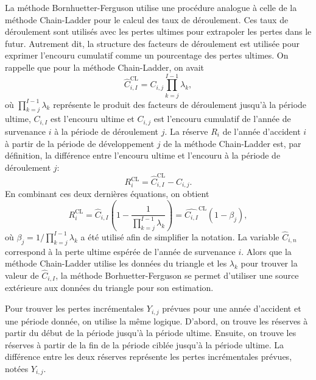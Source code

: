 La méthode Bornhuetter-Ferguson utilise une procédure analogue à celle
de la méthode Chain-Ladder pour le calcul des taux de déroulement. Ces
taux de déroulement sont utilisés avec les pertes ultimes pour
extrapoler les pertes dans le futur. Autrement dit, la structure des
facteurs de déroulement est utilisée pour exprimer l'encouru cumulatif
comme un pourcentage des pertes ultimes. On rappelle que pour la
méthode Chain-Ladder, on avait
\begin{equation*}
  \hat{C}_{i, I}^{\text{CL}} = C_{i, j} \prod_{k = j}^{I-1} \lambda_k,
\end{equation*}
où $\prod_{k=j}^{I-1} \lambda_k $ représente le produit des facteurs
de déroulement jusqu'à la période ultime, $C_{i, I}$ est l'encouru
ultime et $C_{i, j}$ est l'encouru cumulatif de l'année de survenance
$i$ à la période de déroulement $j$. La réserve $R_i$ de l'année
d'accident $i$ à partir de la période de développement $j$ de la
méthode Chain-Ladder est, par définition, la différence entre
l'encouru ultime et l'encouru à la période de déroulement $j$:
\begin{equation*}
  R_i^{\text{CL}} = \hat{C}_{i, I}^{\text{CL}} - C_{i, j}.
\end{equation*}
En combinant ces deux dernières équations, on obtient
\begin{equation*}
  R_i^{\text{CL}} = \hat{C}_{i, I}
  \left(
    1 - \frac{1}{\prod_{k=j}^{I-1} \lambda_k}
  \right) =  \hat{C_{i, I}}^{\text{CL}} (1 - \beta_j),
\end{equation*}
où $\beta_j = 1/\prod_{k=j}^{I-1} \lambda_k$ a été utilisé afin
de simplifier la notation. La variable $\hat{C}_{i,n}$ correspond à la
perte ultime espérée de l'année de survenance $i$. Alors que la
méthode Chain-Ladder utilise les données du triangle et les
$\lambda_k$ pour trouver la valeur de $\hat{C}_{i,I}$, la méthode
Borhuetter-Ferguson se permet d'utiliser une source extérieure aux
données du triangle pour son estimation.

Pour trouver les pertes incrémentales $Y_{i,j}$ prévues pour une année
d'accident et une période donnée, on utilise la même logique. D'abord,
on trouve les réserves à partir du début de la période jusqu'à la
période ultime. Ensuite, on trouve les réserves à partir de la fin de
la période ciblée jusqu'à la période ultime. La différence entre les
deux réserves représente les pertes incrémentales prévues, notées
$Y_{i,j}$.

